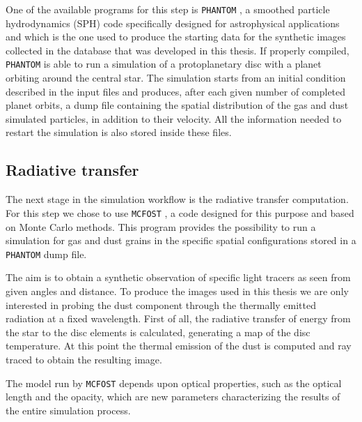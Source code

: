 \documentclass[a4paper,10pt]{report}
\begin{document}
One of the available programs for this step is \lstinline{PHANTOM} \cite{phantom}, a smoothed particle hydrodynamics (SPH) code 
specifically designed for astrophysical applications and which is the one used to produce
the starting data for the synthetic images collected in the database that was developed in this thesis.
If properly compiled, \lstinline{PHANTOM} is able to run a simulation of a protoplanetary disc with a planet orbiting around the central star. 
The simulation starts from an initial condition described in the input files and produces, after each given number of completed planet orbits, a dump file
containing the spatial distribution of the gas and dust simulated particles, in addition to their velocity. 
All the information needed to restart the simulation is also stored inside these files.

\subsection{Radiative transfer}

The next stage in the simulation workflow is the radiative transfer computation. For this
step we chose to use \lstinline{MCFOST} \cite{mcfost1,mcfost2}, a code designed for this purpose and based on Monte Carlo methods.
This program provides the possibility to run a simulation for gas and dust grains in the specific 
spatial configurations stored in a \lstinline{PHANTOM} dump file.

The aim is to obtain a synthetic observation of specific light tracers as seen from given angles and distance.
To produce the images used in this thesis we are only interested in probing the dust component through the thermally
emitted radiation at a fixed wavelength.
First of all, the radiative transfer of energy from the star to the disc elements is calculated, generating a map of the disc temperature.
At this point the thermal emission of the dust is computed and ray traced to obtain the resulting image.

The model run by \lstinline{MCFOST} depends upon optical properties, such as the optical length and the opacity, which 
are new parameters characterizing the results of the entire simulation process.
\end{document}
